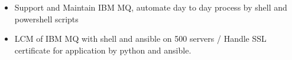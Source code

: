 \documentclass[10pt,a4paper,ragged2e,withhyper]{altacv}
\begin{document}
\begin{paracol}{2}
\divider

\begin{itemize}
\item Support and Maintain IBM MQ, automate day to day process by shell and powershell scripts 
\item LCM of IBM MQ with shell and ansible on 500 servers / Handle SSL certificate for application by python and ansible. 
\end{itemize}

\medskip






\nocite{*}

\printbibliography[heading=pubtype,title={\printinfo{\faFile*[regular]}{Articles}},type=article]

\divider


\switchcolumn



\end{paracol}
\end{document}
